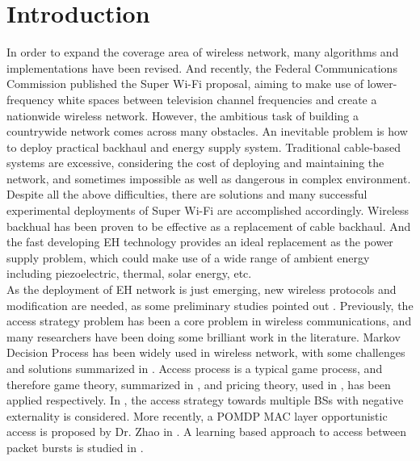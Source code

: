 \documentclass[conference]{IEEEtran}
\begin{document}
\section{Introduction}
In order to expand the coverage area of wireless network,
many algorithms and implementations have been revised.
And recently, the Federal Communications Commission published the Super Wi-Fi proposal,
aiming to make use of lower-frequency white spaces between television channel frequencies
and create a nationwide wireless network.
However, the ambitious task of building a countrywide network comes across many obstacles.
An inevitable problem is how to deploy practical backhaul and energy supply system.
Traditional cable-based systems are excessive, considering the cost of deploying and maintaining the network,
and sometimes impossible as well as dangerous in complex environment.
Despite all the above difficulties, there are solutions and
many successful experimental deployments of Super Wi-Fi are accomplished accordingly.
Wireless backhual has been proven to be effective \cite{30} as a replacement of cable backhaul.
And the fast developing EH technology provides an ideal replacement as the power supply problem,
which could make use of a wide range of ambient energy including piezoelectric, thermal, solar energy, etc.\\
\indent As the deployment of EH network is just emerging,
new wireless protocols and modification are needed, as some preliminary studies pointed out \cite{27}.
Previously, the access strategy problem has been a core problem in wireless communications,
and many researchers have been doing some brilliant work in the literature.
Markov Decision Process has been widely used in wireless network,
with some challenges and solutions summarized in \cite{23}.
Access process is a typical game process,
and therefore game theory, summarized in \cite{22},
and pricing theory, used in \cite{7}, has been applied respectively.
In \cite{5}, the access strategy towards multiple BSs with negative externality is considered.
More recently, a POMDP MAC layer opportunistic access is proposed by Dr. Zhao in \cite{zhao1}.
A learning based approach to access between packet bursts is studied in \cite{kae1}.
\\
\end{document}
